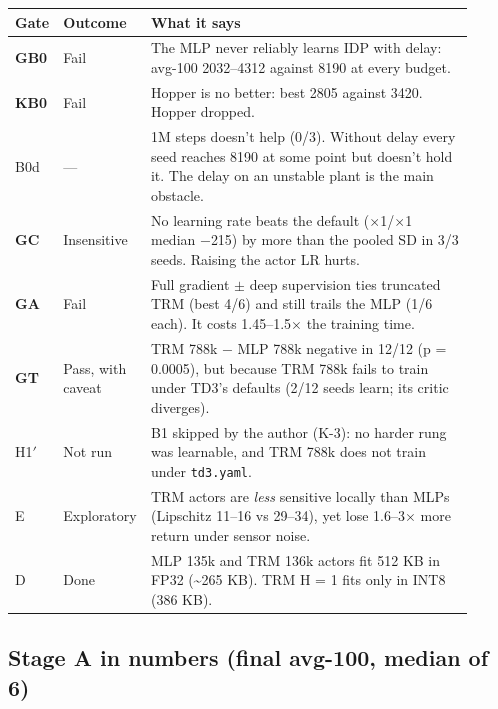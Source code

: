 \documentclass[11pt]{article}
\begin{document}
\begin{center}\small\begin{tabular}{>{\raggedright\arraybackslash}p{0.077\linewidth}>{\raggedright\arraybackslash}p{0.127\linewidth}>{\raggedright\arraybackslash}p{0.703\linewidth}}
\toprule
Gate & Outcome & What it says \\
\midrule
\textbf{GB0} & Fail & The MLP never reliably learns IDP with delay: avg-100 2032--4312 against 8190 at every budget. \\
\textbf{KB0} & Fail & Hopper is no better: best 2805 against 3420. Hopper dropped. \\
B0d & --- & 1M steps doesn't help (0/3). Without delay every seed reaches 8190 at some point but doesn't hold it. The delay on an unstable plant is the main obstacle. \\
\textbf{GC} & Insensitive & No learning rate beats the default ($\times$1/$\times$1 median $-$215) by more than the pooled SD in 3/3 seeds. Raising the actor LR hurts. \\
\textbf{GA} & Fail & Full gradient $\pm$ deep supervision ties truncated TRM (best 4/6) and still trails the MLP (1/6 each). It costs 1.45--1.5$\times$ the training time. \\
\textbf{GT} & Pass, with caveat & TRM 788k $-$ MLP 788k negative in 12/12 (p = 0.0005), but because TRM 788k fails to train under TD3's defaults (2/12 seeds learn; its critic diverges). \\
H1$'$ & Not run & B1 skipped by the author (K-3): no harder rung was learnable, and TRM 788k does not train under \texttt{td3.yaml}. \\
E & Exploratory & TRM actors are \emph{less} sensitive locally than MLPs (Lipschitz 11--16 vs 29--34), yet lose 1.6--3$\times$ more return under sensor noise. \\
D & Done & MLP 135k and TRM 136k actors fit 512 KB in FP32 (\textasciitilde{}265 KB). TRM H = 1 fits only in INT8 (386 KB). \\
\bottomrule
\end{tabular}\end{center}



\subsection*{Stage A in numbers (final avg-100, median of 6)}
\end{document}
